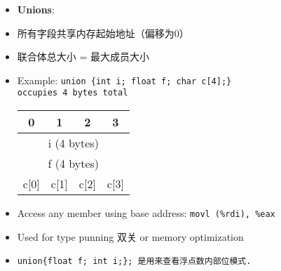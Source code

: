 \begin{itemize}[nosep]
    \item \textbf{Unions}: 
    \item 所有字段共享内存起始地址（偏移为0） 
    \item 联合体总大小 = 最大成员大小
    \item Example: \tt{union \{int i; float f; char c[4];\}} \\occupies 4 bytes total
      \begin{tabular}{|c|c|c|c|} \hline
        0 & 1 & 2 & 3 \\ \hline
        \multicolumn{4}{|c|}{i (4 bytes)} \\ \hline
        \multicolumn{4}{|c|}{f (4 bytes)} \\ \hline
        c[0] & c[1] & c[2] & c[3] \\ \hline
      \end{tabular}
    \item Access any member using base address: \tt{movl (\%rdi), \%eax}
    \item Used for type punning 双关 or memory optimization
    \item \tt{union\{float f; int i;\};} 是用来查看浮点数内部位模式.
\end{itemize}